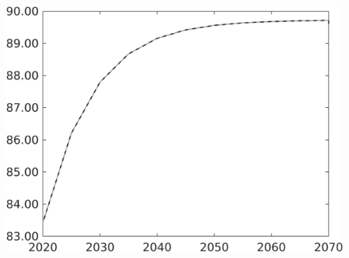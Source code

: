 \begin{figure}[h!!]
\begin{minipage}[]{0.32\textwidth}
	\end{minipage}	
	\begin{minipage}[]{0.32\textwidth}
		\includegraphics[width=1\textwidth]{../../codding_model/own_basedOnFried/optimalPol_010922_revision/figures/all_13Sept22/CompTaul_Equlab_LFBAU_Reg0_gAagg_spillover0_nsk1_xgr1_knspil1_sep1_countec0_GovRev0_etaa0.79_lgd0.png}
	\end{minipage}	

\end{figure}
